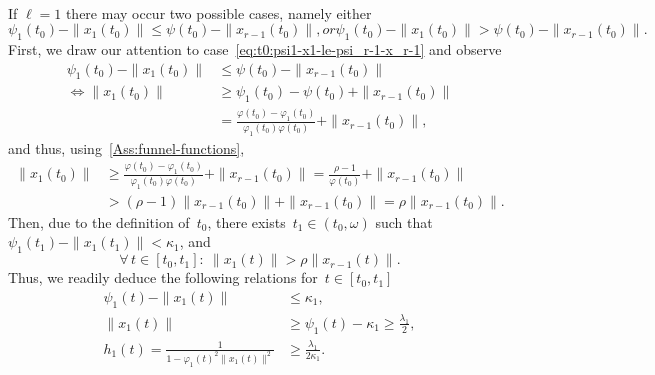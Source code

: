 \documentclass[ envcountsect, envcountsame]{svjour3}
\newcommand{\vp}{\varphi}
\def\red#1{\textcolor[rgb]{0.60,0.10,0.07}{#1}}
\begin{document}
\ \\
If 
$\ell = 1$
there may occur two possible cases, namely either
\begin{subequations}
\begin{equation} \label{eq:t0:psi1-x1-le-psi_r-1-x_r-1}
\psi_1(t_0) - \|x_1(t_0)\| \le \psi(t_0) - \|x_{r-1}(t_0)\|, 
\end{equation}
or
\begin{equation} \label{eq:t0:psi1-x1-g-psi_r-1-x_r-1}
\psi_1(t_0) - \|x_1(t_0)\|  > \psi(t_0) - \|x_{r-1}(t_0)\| .
\end{equation}
\end{subequations}
%
First, we draw our attention to case~\eqref{eq:t0:psi1-x1-le-psi_r-1-x_r-1} and observe
\begin{equation*}
\begin{aligned}
 \psi_1(t_0) - \|x_1(t_0)\| &\le \psi(t_0) - \|x_{r-1}(t_0)\| \\
\iff  \|x_1(t_0) \| &\ge \psi_1(t_0) -  \psi(t_0) + \|x_{r-1}(t_0)\| \\
& = \frac{\vp(t_0) - \vp_1(t_0)}{\vp_1(t_0) \vp(t_0)} + \|x_{r-1}(t_0)\|,
\end{aligned}
\end{equation*}
and thus, using~\ref{Ass:funnel-functions},
\begin{equation*} 
\begin{aligned}
\|x_1(t_0)\| & \ge \frac{\vp(t_0) - \vp_1(t_0)}{\vp_1(t_0) \vp(t_0)} + \|x_{r-1}(t_0)\|  = \frac{\rho - 1}{\vp(t_0)} + \|x_{r-1}(t_0)\| \\
&> (\rho -1) \| x_{r-1}(t_0)\| + \|x_{r-1}(t_0)\| = \rho \|x_{r-1}(t_0)\|.
\end{aligned}
\end{equation*}
Then, due to the definition of~$t_0$, there exists~$ t_1 \in (t_0, \omega)$ such that $\psi_1( t_1) - \|x_1 ( t_1) \| < \kappa_1$, and 
\begin{equation} \label{eq:x1-bigger-rho-xr-1}
\forall\, t\in [t_0,t_1]: \ \|x_1(t)\| > \rho \|x_{r-1}(t)\|  .
\end{equation}
Thus, we readily deduce the following relations for~$t \in [t_0,  t_1]$
\begin{equation} \label{eq:relations-1-h-x}
\begin{aligned}
\psi_1(t) - \| x_1(t)\| &\le \kappa_1, \\
\| x_1 (t) \| &\ge \psi_1(t) - \kappa_1 \ge \frac{\lambda_1}{2}, \\
h_1(t) = \frac{1}{1-\vp_1(t)^2 \| x_1(t)\|^2} &\ge \frac{\lambda_1}{2 \kappa_1}.
\end{aligned}
\end{equation}
\end{document}
